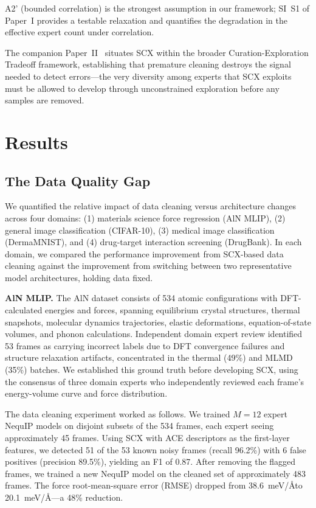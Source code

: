 \documentclass[12pt,a4paper]{article}
\begin{document}
A2' (bounded correlation) is the strongest assumption in our framework; SI~S1 of Paper~I provides a testable relaxation and quantifies the degradation in the effective expert count under correlation.

The companion Paper~II~\cite{scx2025curation} situates SCX within the broader Curation-Exploration Tradeoff framework, establishing that premature cleaning destroys the signal needed to detect errors---the very diversity among experts that SCX exploits must be allowed to develop through unconstrained exploration before any samples are removed.

\section{Results}

\subsection{The Data Quality Gap}

We quantified the relative impact of data cleaning versus architecture changes across four domains: (1) materials science force regression (AlN MLIP), (2) general image classification (CIFAR-10), (3) medical image classification (DermaMNIST), and (4) drug-target interaction screening (DrugBank). In each domain, we compared the performance improvement from SCX-based data cleaning against the improvement from switching between two representative model architectures, holding data fixed.

\textbf{AlN MLIP.} The AlN dataset consists of 534 atomic configurations with DFT-calculated energies and forces, spanning equilibrium crystal structures, thermal snapshots, molecular dynamics trajectories, elastic deformations, equation-of-state volumes, and phonon calculations. Independent domain expert review identified 53 frames as carrying incorrect labels due to DFT convergence failures and structure relaxation artifacts, concentrated in the thermal (49\%) and MLMD (35\%) batches. We established this ground truth before developing SCX, using the consensus of three domain experts who independently reviewed each frame's energy-volume curve and force distribution.

The data cleaning experiment worked as follows. We trained $M=12$ expert NequIP models on disjoint subsets of the 534 frames, each expert seeing approximately 45 frames. Using SCX with ACE descriptors as the first-layer features, we detected 51 of the 53 known noisy frames (recall 96.2\%) with 6 false positives (precision 89.5\%), yielding an F1 of 0.87. After removing the flagged frames, we trained a new NequIP model on the cleaned set of approximately 483 frames. The force root-mean-square error (RMSE) dropped from 38.6~meV/\AA to 20.1~meV/\AA---a 48\% reduction.
\end{document}
